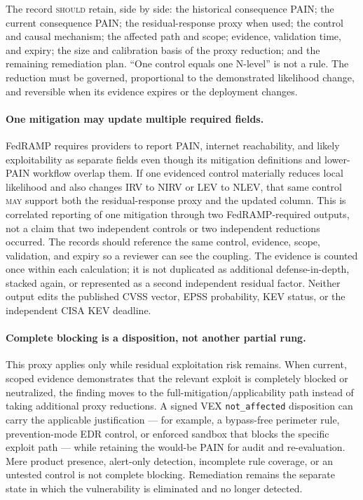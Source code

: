 \documentclass[11pt]{article}
\newcommand{\code}[1]{\texttt{#1}}
\newcommand{\rfckw}[1]{\textsc{#1}}
\begin{document}
The record \rfckw{should} retain, side by side: the historical consequence PAIN;
the current consequence PAIN; the residual-response proxy when used; the control
and causal mechanism; the affected path and scope; evidence, validation time, and
expiry; the size and calibration basis of the proxy reduction; and the remaining
remediation plan. ``One control equals one N-level'' is not a rule. The reduction
must be governed, proportional to the demonstrated likelihood change, and
reversible when its evidence expires or the deployment changes.

\paragraph{One mitigation may update multiple required fields.}
FedRAMP requires providers to report PAIN, internet reachability, and likely
exploitability as separate fields even though its mitigation definitions and
lower-PAIN workflow overlap them. If one evidenced control materially reduces
local likelihood and also changes IRV to NIRV or LEV to NLEV, that same control
\rfckw{may} support both the residual-response proxy and the updated column. This
is correlated reporting of one mitigation through two FedRAMP-required outputs,
not a claim that two independent controls or two independent reductions occurred.
The records should reference the same control, evidence, scope, validation, and
expiry so a reviewer can see the coupling. The evidence is counted once within
each calculation; it is not duplicated as additional defense-in-depth, stacked
again, or represented as a second independent residual factor. Neither output
edits the published CVSS vector, EPSS probability, KEV status, or the independent
CISA KEV deadline.

\paragraph{Complete blocking is a disposition, not another partial rung.}
This proxy applies only while residual exploitation risk remains. When current,
scoped evidence demonstrates that the relevant exploit is completely blocked or
neutralized, the finding moves to the full-mitigation/applicability path instead
of taking additional proxy reductions. A signed VEX \code{not\_affected}
disposition can carry the applicable justification --- for example, a bypass-free
perimeter rule, prevention-mode EDR control, or enforced sandbox that blocks the
specific exploit path --- while retaining the would-be PAIN for audit and
re-evaluation. Mere product presence, alert-only detection, incomplete rule
coverage, or an untested control is not complete blocking. Remediation remains the
separate state in which the vulnerability is eliminated and no longer detected.
\end{document}
